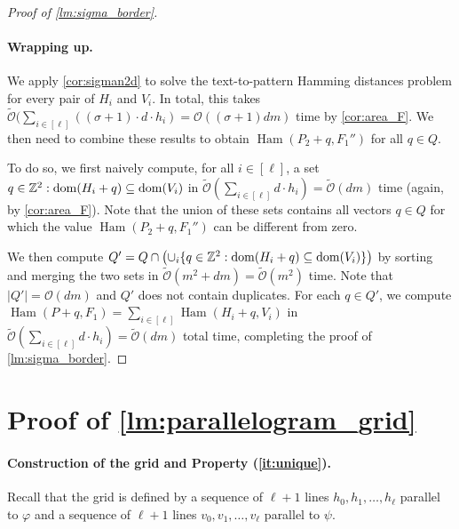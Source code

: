 \documentclass[twoside,leqno]{article}
\newcommand{\Z}{\mathbb{Z}}
\renewcommand{\O}{\mathcal{O}}
\newcommand{\tO}{\tilde{\mathcal{O}}}
\renewcommand{\phi}{\varphi}
\DeclareMathOperator*{\Ham}{Ham}
\newcommand{\absolute}[1]{\left\lvert#1\right\rvert}
\begin{document}
\begin{proof}[{Proof of \cref{lm:sigma_border}}]
\paragraph*{Wrapping up.}
We apply \cref{cor:sigman2d} to solve the text-to-pattern Hamming distances problem for every pair of $H_i$ and $V_i$. In total, this takes $\tO(\sum_{i \in [\ell]} ((\sigma+1) \cdot d \cdot h_i) = \O((\sigma+1) dm)$ time by \cref{cor:area_F}. We then need to combine these results to obtain $\Ham(P_2 + q, F_1'')$ for all $q \in Q$. 

To do so, we first naively compute, for all $i \in [\ell]$, a set ${q \in \Z^2 : \d{H_i+q} \subseteq \d{V_i}}$ in $\tO(\sum_{i \in [\ell]} d \cdot h_i) = \tO(dm)$ time (again, by \cref{cor:area_F}). Note that the union of these sets contains all vectors $q \in Q$ for which the value $\Ham(P_2 + q, F_1'')$ can be different from zero. 

We then compute $Q' = Q \cap \bigl( \cup_i \{q \in \Z^2 : \d{H_i+q} \subseteq \d{V_i}\} \bigr)$ by sorting and merging the two sets in $\tO(m^2 + dm) = \tO(m^2)$ time. Note that $\absolute{Q'} = \O(dm)$ and $Q'$ does not contain duplicates. For each $q \in Q'$, we compute $\Ham(P + q, F_1) = \sum_{i \in [\ell]} \Ham(H_i + q, V_i)$ in $\tO(\sum_{i \in [\ell]} d \cdot h_i) = \tO(dm)$ total time, completing the proof of \cref{lm:sigma_border}.
\end{proof}





\appendix
\section{Proof of \cref{lm:parallelogram_grid}}
\label{app:parallelogram_grid}
\paragraph*{Construction of the grid and Property (\ref{it:unique}).}
Recall that the grid is defined by a sequence of $\ell+1$ lines $h_0, h_1, \ldots, h_\ell$ parallel to $\phi$ and a sequence of $\ell+1$ lines $v_0, v_1, \ldots, v_\ell$ parallel to $\psi$. 
\end{document}
